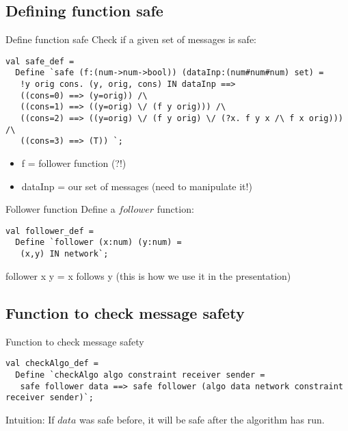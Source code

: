 \documentclass[10pt,a4paper]{beamer}
\begin{document}
\subsection{Defining function safe}

\begin{frame}[fragile]{Define function safe}
Check if a given set of messages is safe:

\begin{lstlisting}
val safe_def = 
  Define `safe (f:(num->num->bool)) (dataInp:(num#num#num) set) = 
   !y orig cons. (y, orig, cons) IN dataInp ==> 
   ((cons=0) ==> (y=orig)) /\ 
   ((cons=1) ==> ((y=orig) \/ (f y orig))) /\ 
   ((cons=2) ==> ((y=orig) \/ (f y orig) \/ (?x. f y x /\ f x orig))) /\ 
   ((cons=3) ==> (T)) `; 
\end{lstlisting}
\begin{itemize}
\item f = follower function (?!)
\item dataInp = our set of messages (need to manipulate it!)
\end{itemize}
\end{frame}

\begin{frame}[fragile]{Follower function}
Define a $ follower $ function:

\begin{lstlisting}
val follower_def = 
  Define `follower (x:num) (y:num) = 
   (x,y) IN network`;
\end{lstlisting}
follower x y = x follows y (this is how we use it in the presentation)
\end{frame}

\subsection{Function to check message safety}

\begin{frame}[fragile]{Function to check message safety}

\begin{lstlisting}
val checkAlgo_def = 
  Define `checkAlgo algo constraint receiver sender = 
   safe follower data ==> safe follower (algo data network constraint receiver sender)`;
\end{lstlisting}

Intuition: If $ data $ was safe before, it will be safe after the algorithm has run.

\end{frame}
\end{document}
